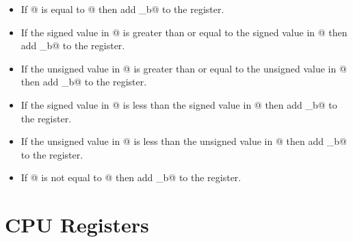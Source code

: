 \begin{itemize}
\item{}
\label{insn:beq}

If @ is equal to @ then add \verb@imm_b@ to the
\verb@pc@ register.

\item{}
\label{insn:bge}

If the signed value in @ is greater than or equal to the
signed value in @ then add \verb@imm_b@ to the
\verb@pc@ register.

\item{}
\label{insn:bgeu}

If the unsigned value in @ is greater than or equal to the
unsigned value in @ then add \verb@imm_b@ to the
\verb@pc@ register.

\item{}
\label{insn:blt}

If the signed value in @ is less than the
signed value in @ then add \verb@imm_b@ to the
\verb@pc@ register.

\item{}
\label{insn:bltu}

If the unsigned value in @ is less than the
unsigned value in @ then add \verb@imm_b@ to the
\verb@pc@ register.

\item{}
\label{insn:bne}

If @ is not equal to @ then add \verb@imm_b@ to the
\verb@pc@ register.

\end{itemize}





\section{CPU Registers}
\label{cpuregs}

